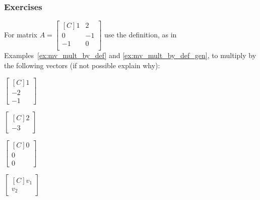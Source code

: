 \subsubsection{Exercises}
\begin{exercise}For matrix 
$A=\begin{bmatrix*}[C]
1  & 2  \\
0  & -1  \\
-1 & 0  \\
\end{bmatrix*}$
use the definition, as in \\Examples~\ref{ex:mv_mult_by_def}
and \ref{ex:mv_mult_by_def_gen}, to  multiply by the 
following vectors (if not possible explain why):\\
\begin{inparaenum}[a.)]
\item $\begin{bmatrix*}[C]1 \\ -2 \\ -1 \end{bmatrix*}$\quad 
\item $\begin{bmatrix*}[C]2 \\ -3 \end{bmatrix*}$\quad 
\item $\begin{bmatrix*}[C]0 \\ 0 \\ 0 \end{bmatrix*}$\quad
\item $\begin{bmatrix*}[C]v_1 \\ v_2 \end{bmatrix*}$
\end{inparaenum}
\end{exercise}

